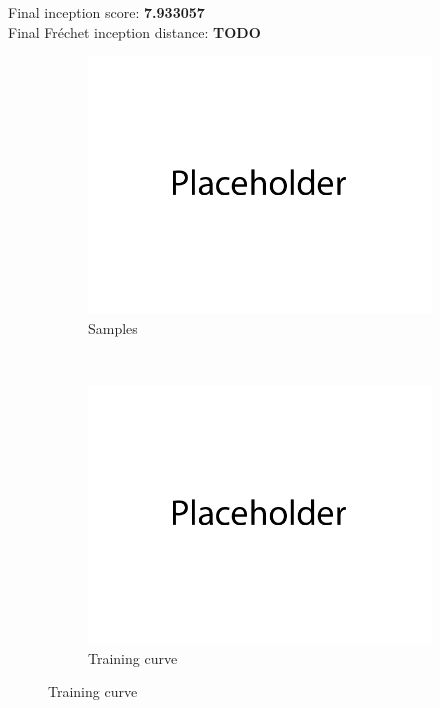 \documentclass{article}
\begin{document}
Final inception score: \textbf{7.933057} \\
Final Fréchet inception distance: \textbf{TODO}
\begin{figure}[H]
    \centering
    \begin{subfigure}{0.6\textwidth}
        \centering
        \includegraphics[width=\textwidth]{figures/q2_samples.png}
        \caption{Samples}
    \end{subfigure}
    \\
    \begin{subfigure}{0.6\textwidth}
        \centering
        \includegraphics[width=\textwidth]{figures/q2_losses.png}
        \caption{Training curve}
    \end{subfigure}

\end{figure}
\end{document}

